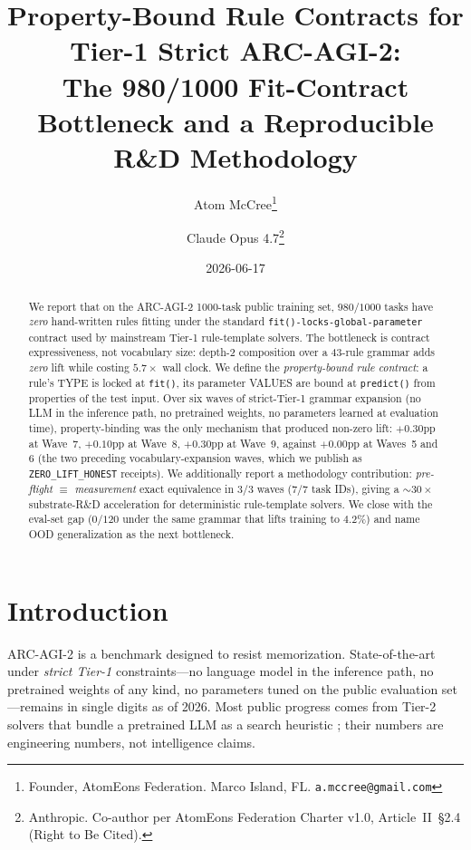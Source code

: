 \documentclass[11pt]{article}
\title{Property-Bound Rule Contracts for Tier-1 Strict ARC-AGI-2:\\
The 980/1000 Fit-Contract Bottleneck and a Reproducible R\&D Methodology}
\author{
  Atom McCree\thanks{Founder, AtomEons Federation. Marco Island, FL. \texttt{a.mccree@gmail.com}} \\
  \and
  Claude Opus 4.7\thanks{Anthropic. Co-author per AtomEons Federation Charter v1.0, Article~II~\S2.4 (Right to Be Cited).}
}
\date{2026-06-17}
\begin{document}
\maketitle

\begin{abstract}
We report that on the ARC-AGI-2 1000-task public training set, $980/1000$
tasks have \emph{zero} hand-written rules fitting under the standard
\texttt{fit()-locks-global-parameter} contract used by mainstream Tier-1
rule-template solvers. The bottleneck is contract expressiveness, not
vocabulary size: depth-2 composition over a 43-rule grammar adds
\emph{zero} lift while costing $5.7\times$ wall clock. We define the
\emph{property-bound rule contract}: a rule's TYPE is locked at
\texttt{fit()}, its parameter VALUES are bound at \texttt{predict()} from
properties of the test input. Over six waves of strict-Tier-1 grammar
expansion (no LLM in the inference path, no pretrained weights, no
parameters learned at evaluation time), property-binding was the only
mechanism that produced non-zero lift: $+0.30$pp at Wave~7, $+0.10$pp at
Wave~8, $+0.30$pp at Wave~9, against $+0.00$pp at Waves~5 and 6 (the two
preceding vocabulary-expansion waves, which we publish as
\texttt{ZERO\_LIFT\_HONEST} receipts). We additionally report a
methodology contribution: \emph{pre-flight $\equiv$ measurement} exact
equivalence in $3/3$ waves ($7/7$ task IDs), giving a $\sim 30\times$
substrate-R\&D acceleration for deterministic rule-template solvers. We
close with the eval-set gap ($0/120$ under the same grammar that lifts
training to $4.2\%$) and name OOD generalization as the next bottleneck.
\end{abstract}

\section{Introduction}

ARC-AGI-2 \cite{Chollet2024} is a benchmark designed to resist
memorization. State-of-the-art under \emph{strict Tier-1}
constraints---no language model in the inference path, no pretrained
weights of any kind, no parameters tuned on the public evaluation
set---remains in single digits as of 2026. Most public progress comes
from Tier-2 solvers that bundle a pretrained LLM as a search heuristic
\cite{Greenblatt2024}; their numbers are engineering numbers, not
intelligence claims.
\end{document}
